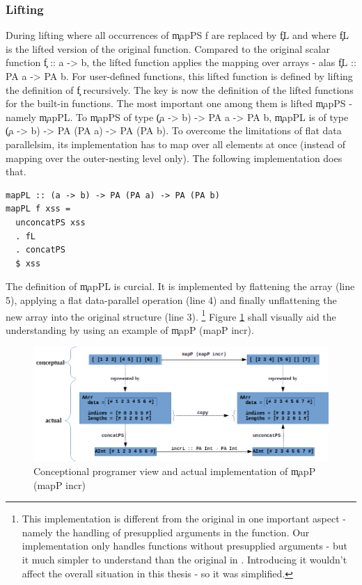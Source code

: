       
    \subsubsection{Lifting}
      During lifting where all occurrences of \c{mapPS f} are
      replaced by \c{fL} and where \c{fL}
      is the lifted version of the original function.
      Compared to the original scalar function \c{f :: a -> b}, the lifted
      function applies the mapping over arrays - alas \c{fL :: PA a -> PA b}.
      For user-defined functions, this lifted function is defined
      by lifting the definition of \c{f} recursively.
      The key is now the definition of the lifted functions for the built-in functions.
      The most important one among them is lifted \c{mapPS} - namely \c{mapPL}.
      To \c{mapPS} of type \c{(a -> b) -> PA a -> PA b},
      \c{mapPL} is of type \c{(a -> b) -> PA (PA a) -> PA (PA b)}.
      To overcome the limitations of flat data parallelsim,
      its implementation has to map over all elements at once
      (instead of mapping over the outer-nesting level only).
      The following implementation does that.
    \begin{lstlisting}
mapPL :: (a -> b) -> PA (PA a) -> PA (PA b)
mapPL f xss =
  unconcatPS xss
  . fL
  . concatPS
  $ xss
    \end{lstlisting}
    The definition of \c{mapPL} is curcial. It is implemented by flattening the array (line 5), applying a flat data-parallel operation (line 4)
    and finally unflattening the new array into the original structure (line 3).
    \footnote{This implementation is different from the original in one important aspect - 
    namely the handling of presupplied arguments in the function. Our
    implementation only handles functions without presupplied arguments -
    but it much simpler to understand than the original in \cite{Harness2008}.
    Introducing it wouldn't affect the overall situation in this thesis -
    so it was simplified.
    }
    Figure \ref{figure:mapP} shall visually aid the understanding by using
    an example of \c{mapP (mapP incr)}.
    
    \begin{figure}[h!]
        \begin{center}
        \includegraphics[width=\linewidth]{mapP.png}
        \caption{Conceptional programer view and actual implementation of \c{mapP (mapP incr)}}
        \label{figure:mapP}
        \end{center}
    \end{figure}
    

